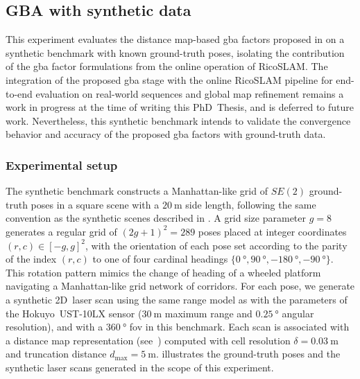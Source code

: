 \subsection{GBA with synthetic data}\label{sec:slam:results:gba}

This experiment evaluates the distance map-based \gls{gba} factors proposed in
 on a synthetic benchmark with known ground-truth poses,
isolating the contribution of the \gls{gba} factor formulations from
the online operation of RicoSLAM.
The integration of the proposed \gls{gba} stage with the online RicoSLAM
pipeline for end-to-end evaluation on real-world sequences and global map
refinement remains a work in progress at the time of writing this PhD~Thesis,
and is deferred to future work. Nevertheless, this synthetic benchmark intends
to validate the convergence behavior and accuracy of the proposed \gls{gba}
factors with ground-truth data.

\subsubsection{Experimental setup}
\label{sec:slam:results:gba:setup}

The synthetic benchmark constructs a Manhattan-like grid of $SE(2)$
ground-truth poses in a square scene with a $\SI{20}{\metre}$ side length,
following the same convention as the synthetic scenes described in
.
A grid size parameter $g = 8$ generates a regular grid of $(2g+1)^2 = 289$
poses placed at integer coordinates $(r, c) \in [-g, g]^2$, with the
orientation of each pose set according to the parity of the index $(r, c)$
to one of four cardinal headings $\{\SI{0}{\degree}, \SI{+90}{\degree},
\SI{-180}{\degree}, \SI{-90}{\degree}\}$. This rotation pattern mimics
the change of heading of a wheeled platform navigating a
Manhattan-like grid network of corridors. For each pose, we generate a synthetic
2D~laser scan using the same range model as
 with the parameters
of the Hokuyo~UST-10LX sensor ($\SI{30}{\metre}$ maximum range and
$\SI{0.25}{\degree}$ angular resolution), and
with a $\SI{360}{\degree}$ \gls{fov} in this benchmark.
Each scan is associated with a distance map representation
(see~) computed with cell
resolution $\delta = \SI{0.03}{\metre}$ and truncation distance
$d_{\max} = \SI{5}{\metre}$.
 illustrates the ground-truth poses
and the synthetic laser scans generated in the scope of this experiment.


